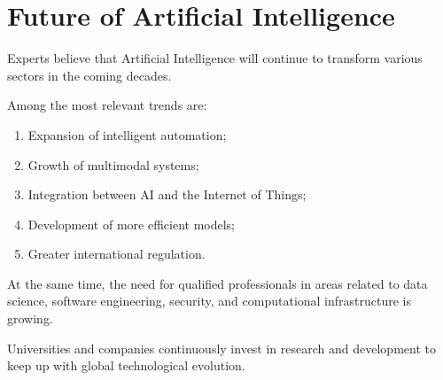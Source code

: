 \section{Future of Artificial Intelligence}

Experts believe that Artificial Intelligence will continue to transform various sectors
in the coming decades.

Among the most relevant trends are:

\begin{enumerate}
    \item Expansion of intelligent automation;
    \item Growth of multimodal systems;
    \item Integration between AI and the Internet of Things;
    \item Development of more efficient models;
    \item Greater international regulation.
\end{enumerate}

At the same time, the need for qualified professionals in areas related to
data science, software engineering, security, and computational infrastructure is growing.

Universities and companies continuously invest in research and development to
keep up with global technological evolution. 